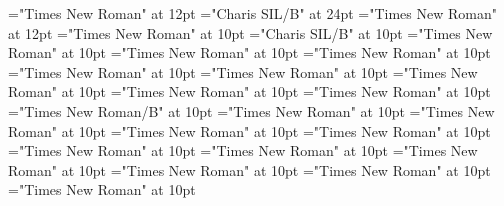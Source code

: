 \documentclass[a4paper]{article}
\begin{document}
\pagestyle{plain}
\sloppy
\setlength{\parfillskip}{0pt plus 1fil}
\font{}="Times New Roman" at 12pt
\font{}="Charis SIL/B" at 24pt
\font{}="Times New Roman" at 12pt
\font\entryletDatadicBody="Times New Roman" at 10pt
\font\headwordmcbentryletDatadicBody="Charis SIL/B" at 10pt
\font\sensesentryletDatadicBody="Times New Roman" at 10pt
\font\sensesensesentryletDatadicBody="Times New Roman" at 10pt
\font\LexSensepublishStemPossessiveFormsensesensesentryletDatadicBody="Times New Roman" at 10pt
\font\grammaticalinfosensesensesentryletDatadicBody="Times New Roman" at 10pt
\font\partofspeechesgrammaticalinfosensesensesentryletDatadicBody="Times New Roman" at 10pt
\font\spanespartofspeechesgrammaticalinfosensesensesentryletDatadicBody="Times New Roman" at 10pt
\font\subsensessensesensesentryletDatadicBody="Times New Roman" at 10pt
\font\sensesubsensessensesensesentryletDatadicBody="Times New Roman" at 10pt
\font\xsensenumbersensesubsensessensesensesentryletDatadicBody="Times New Roman/B" at 10pt
\font\grammaticalinfosensesubsensessensesensesentryletDatadicBody="Times New Roman" at 10pt
\font\partofspeechesgrammaticalinfosensesubsensessensesensesentryletDatadicBody="Times New Roman" at 10pt
\font\spanespartofspeechesgrammaticalinfosensesubsensessensesensesentryletDatadicBody="Times New Roman" at 10pt
\font{}="Times New Roman" at 10pt
\font\spanesdefinitionessensesubsensessensesensesentryletDatadicBody="Times New Roman" at 10pt
\font\LexSensepublishStemSocioLinguisticsNotePubessensesubsensessensesensesentryletDatadicBody="Times New Roman" at 10pt
\font\spanesLexSensepublishStemSocioLinguisticsNotePubessensesubsensessensesensesentryletDatadicBody="Times New Roman" at 10pt
\font\spanmcbLexSensepublishStemSocioLinguisticsNotePubessensesubsensessensesensesentryletDatadicBody="Times New Roman" at 10pt
\font\EmphasizedTextesLexSensepublishStemSocioLinguisticsNotePubessensesubsensessensesensesentryletDatadicBody="Times New Roman" at 10pt
\font\FocusedmcbLexSensepublishStemSocioLinguisticsNotePubessensesubsensessensesensesentryletDatadicBody="Times New Roman" at 10pt
\end{document}
